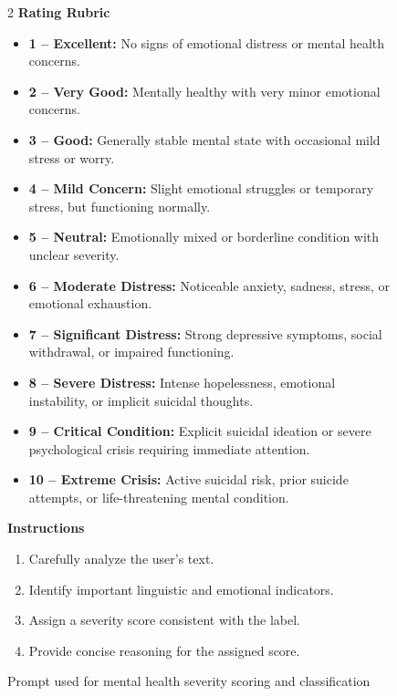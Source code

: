 \documentclass[conference]{IEEEtran}
\makeatletter
\let\end\a@l@end
\makeatother
\begin{document}
\begin{figure}[t]
\begin{tcolorbox}
\begin{multicols}{2}
\vspace{2mm}
\textbf{Rating Rubric}
\begin{itemize}
    \item \textbf{1 -- Excellent:} No signs of emotional distress or mental health concerns.
    \item \textbf{2 -- Very Good:} Mentally healthy with very minor emotional concerns.
    \item \textbf{3 -- Good:} Generally stable mental state with occasional mild stress or worry.
    \item \textbf{4 -- Mild Concern:} Slight emotional struggles or temporary stress, but functioning normally.
    \item \textbf{5 -- Neutral:} Emotionally mixed or borderline condition with unclear severity.
    \item \textbf{6 -- Moderate Distress:} Noticeable anxiety, sadness, stress, or emotional exhaustion.
    \item \textbf{7 -- Significant Distress:} Strong depressive symptoms, social withdrawal, or impaired functioning.
    \item \textbf{8 -- Severe Distress:} Intense hopelessness, emotional instability, or implicit suicidal thoughts.
    \item \textbf{9 -- Critical Condition:} Explicit suicidal ideation or severe psychological crisis requiring immediate attention.
    \item \textbf{10 -- Extreme Crisis:} Active suicidal risk, prior suicide attempts, or life-threatening mental condition.
\end{itemize}

\vspace{2mm}
\textbf{Instructions}
\begin{enumerate}
    \item Carefully analyze the user's text.
    \item Identify important linguistic and emotional indicators.
    \item Assign a severity score consistent with the label.
    \item Provide concise reasoning for the assigned score.
\end{enumerate}

\end{multicols}
\end{tcolorbox}

\caption{Prompt used for mental health severity scoring and classification}
\label{prompt:mental_health_prompt}

\end{figure}
\end{document}
